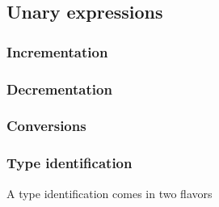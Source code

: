 \documentclass[a4paper,12pt]{article}
\begin{document}
\subsection{Unary expressions}
\label{sec:interface:unary-expr}

\subsubsection{Incrementation}

\subsubsection{Decrementation}

\subsubsection{Conversions}

\subsubsection{Type identification}

A type identification comes in two flavors
\end{document}
